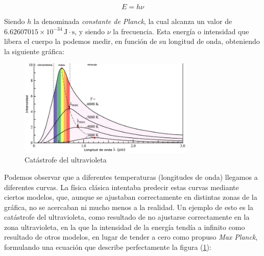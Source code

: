 \documentclass[12pt]{article}
\numberwithin{equation}{section} %
\begin{document}
        \vspace{5mm}

        \begin{equation}
            E = h \nu
            \label{eq: planck}
        \end{equation}

        \vspace{5mm}

        Siendo \( h \) la denominada \textit{constante de Planck}, la cual alcanza un valor de \( 6.62607015 \times 10^{-34} \, \text{J} \cdot \text{s} \), y siendo \( \nu \) la frecuencia. Esta energía o intensidad que libera el cuerpo la podemos medir, en función de su longitud de onda, obteniendo la siguiente gráfica:

        \vspace{5mm}

        \begin{figure}[h]
            \centering
            \includegraphics[width=0.75\textwidth]{img/Introduccion/catastrofe_ultravioleta.png}
            \caption{Catástrofe del ultravioleta}
            \label{fig: f2}
        \end{figure}

        \vspace{5mm}

        Podemos observar que a diferentes temperaturas (longitudes de onda) llegamos a diferentes curvas. La física clásica intentaba predecir estas curvas mediante ciertos modelos, que, aunque se ajustaban correctamente en distintas zonas de la gráfica, no se acercaban ni mucho menos a la realidad. Un ejemplo de esto es la catástrofe del ultravioleta, como resultado de no ajustarse correctamente en la zona ultravioleta, en la que la intensidad de la energía tendía a infinito como resultado de otros modelos, en lugar de tender a cero como propuso \textit{Max Planck}, formulando una ecuación que describe perfectamente la figura (\ref{fig: f2}):
\end{document}
